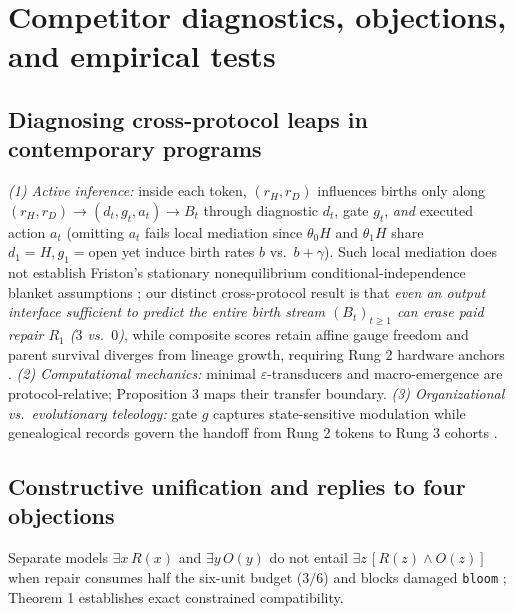 \documentclass[11pt,letterpaper]{article}
\newcounter{none}
\begin{document}
\section{Competitor diagnostics, objections, and empirical
tests}\label{competitor-diagnostics-objections-and-empirical-tests}

\subsection{Diagnosing cross-protocol leaps in contemporary
programs}\label{diagnosing-cross-protocol-leaps-in-contemporary-programs}

\emph{(1) Active inference:} inside each token, \((r_H, r_D)\)
influences births only along \((r_H, r_D) \to (d_t, g_t, a_t) \to B_t\)
through diagnostic \(d_t\), gate \(g_t\), \emph{and} executed action
\(a_t\) (omitting \(a_t\) fails local mediation since \(\theta_0 H\) and
\(\theta_1 H\) share \(d_1=H, g_1=\mathrm{open}\) yet induce birth rates
\(b\) vs.~\(b+\gamma\)). Such local mediation does not establish
Friston's stationary nonequilibrium conditional-independence blanket
assumptions
\citep{friston2013, parrPezzuloFriston2022, bruineberg2022, raja2021};
our distinct cross-protocol result is that \emph{even an output
interface sufficient to predict the entire birth stream
\((B_t)_{t\ge 1}\) can erase paid repair \(R_1\) (\(3\) vs.~\(0\))},
while composite scores retain affine gauge freedom \citep{biehl2021} and
parent survival diverges from lineage growth, requiring Rung 2 hardware
anchors \citep{sethTsakiris2018}. \emph{(2) Computational mechanics:}
minimal \(\varepsilon\)-transducers
\citep{shaliziCrutchfield2001, barnettCrutchfield2015} and
macro-emergence \citep{hoel2013} are protocol-relative; Proposition 3
maps their transfer boundary. \emph{(3) Organizational vs.~evolutionary
teleology:} gate \(g\) captures state-sensitive modulation
\citep{bich2024} while genealogical records govern the handoff from Rung
2 tokens to Rung 3 cohorts \citep{cuciniello2026}.

\subsection{Constructive unification and replies to four
objections}\label{constructive-unification-and-replies-to-four-objections}

Separate models \(\exists x\,R(x)\) and \(\exists y\,O(y)\) do not
entail \(\exists z\,[R(z)\land O(z)]\) when repair consumes half the
six-unit budget (\(3/6\)) and blocks damaged \texttt{bloom}
\citep{friedman1974, kitcher1989}; Theorem 1 establishes exact
constrained compatibility.
\end{document}
